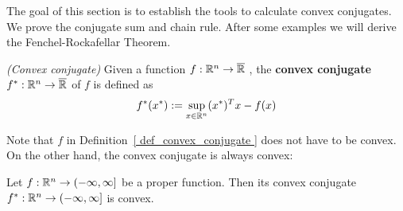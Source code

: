 The goal of this section is to establish the tools to calculate convex conjugates. 
We prove the conjugate sum and chain rule.
After some examples we will derive the Fenchel-Rockafellar Theorem.
\begin{definition}
  \label{ def_convex_conjugate }
  \emph{(Convex conjugate)}
  Given a function
  $
    f:
    \mathbb{R}^n \to \overline{\mathbb{R}}
  $
  ,
  the 
  \textbf{convex conjugate}
  $
    f^*:
    \mathbb{R}^n \to \overline{\mathbb{R}}
  $
  of $f$ is defined as
  \begin{gather}
    f^*(x^*)
    :=
    \sup_{ x \in \mathbb{R}^n }
    (x^*)^T x - f(x)
  \end{gather}
\end{definition}

Note that $f$ in Definition~\ref{ def_convex_conjugate }
does not have to be convex. On the other hand, the convex conjugate is always convex:

\begin{proposition}
  Let  
  $
    f:
    \mathbb{R}^n \to ( - \infty, \infty ]
  $
  be a proper function. 
  Then its convex conjugate
  $
    f^*:
    \mathbb{R}^n \to ( - \infty, \infty ]
  $
  is convex.
\end{proposition}


